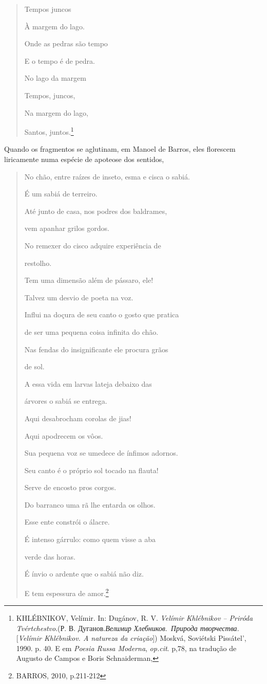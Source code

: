 \begin{quote}
Tempos juncos

À margem do lago.

Onde as pedras são tempo

E o tempo é de pedra.

No lago da margem

Tempos, juncos,

Na margem do lago,

Santos, juntos.\footnote{KHLÉBNIKOV, Velímir. In: Dugánov, R. V.
  \emph{Velímir Khlébnikov -- Priróda Tvértchestvo}.(Р. В.
  Дуганов.\emph{Велимир Хлебников}.~\emph{Природа творчества}.
  {[}\emph{Velímir Khlébnikov. A natureza da criação}{]}) Moskvá,
  Soviétski Pissátel', 1990. p. 40. E em \emph{Poesia Russa Moderna},
  \emph{op.cit}. p,78, na tradução de Augusto de Campos e Boris
  Schnaiderman,}
\end{quote}

Quando os fragmentos se aglutinam, em Manoel de Barros, eles florescem
liricamente numa espécie de apoteose dos sentidos,

\begin{quote}
No chão, entre raízes de inseto, esma e cisca o sabiá.

É um sabiá de terreiro.

Até junto de casa, nos podres dos baldrames,

vem apanhar grilos gordos.

No remexer do cisco adquire experiência de

restolho.

Tem uma dimensão além de pássaro, ele!

Talvez um desvio de poeta na voz.

Influi na doçura de seu canto o gosto que pratica

de ser uma pequena coisa infinita do chão.

Nas fendas do insignificante ele procura grãos

de sol.

A essa vida em larvas lateja debaixo das

árvores o sabiá se entrega.

Aqui desabrocham corolas de jias!

Aqui apodrecem os vôos.

Sua pequena voz se umedece de ínfimos adornos.

Seu canto é o próprio sol tocado na flauta!

Serve de encosto pros corgos.

Do barranco uma rã lhe entarda os olhos.

Esse ente constrói o álacre.

É intenso gárrulo: como quem visse a aba

verde das horas.

É ínvio o ardente que o sabiá não diz.

E tem espessura de amor.\footnote{BARROS, 2010, p.211-212}
\end{quote}


